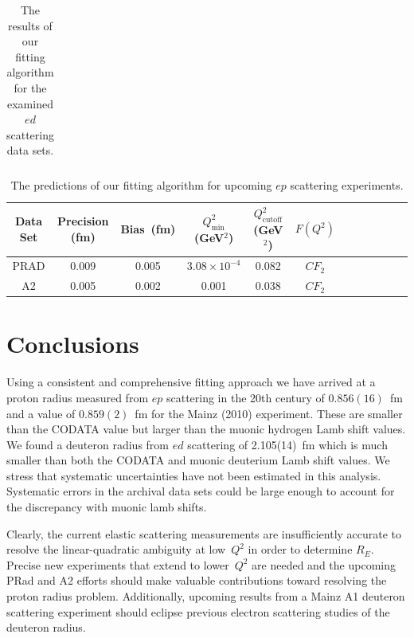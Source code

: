 \documentclass[aps,prd,twocolumn,groupedaddress,10pt]{revtex4-1}
\begin{document}
\begin{widetext}
\begin{center}
\begin{table}
\begin{tabular}{|c |c| c| c| c| c| c| c| c| c| c| c|}
		\hline
	\end{tabular} 
	\caption{The results of our fitting algorithm for the examined $ed$ scattering data sets.}
	\label{deuteron_table}
\end{table}
		\begin{table}[h!]
			\begin{tabular}{|c |c| c| c| c| c| c| c| c| c| c| c|} 
				\hline
				Data Set & Precision (fm) & Bias~(fm) &  $Q^2_\text{min}$ (GeV$^2$) & $Q^2_\text{cutoff}$ (GeV$^2$)  & $F(Q^2)$  \\ 
				\hline
				PRAD & 0.009 & 0.005 & $3.08\times 10^{-4}$ & 0.082 & ${CF}_2$  \\
				\hline
				A2 & 0.005 & 0.002 & 0.001  & 0.038 &  ${CF}_{2}$ \\		
				\hline
			\end{tabular} 
			\caption{The predictions of our fitting algorithm for upcoming $ep$ scattering experiments.}
			\label{future_experiments_table}
\end{table}\end{center}\end{widetext}

\section{Conclusions}

Using a consistent and comprehensive fitting approach we have arrived at a proton radius measured from $ep$ scattering in the 20th century of $0.856(16)$~fm and a value of $0.859(2)$~fm for the Mainz (2010) experiment. These are smaller than the CODATA value but larger than the muonic hydrogen Lamb shift values. We found a deuteron radius from $ed$ scattering of 2.105(14)~fm which is much smaller than both the CODATA and muonic deuterium Lamb shift values. We stress that systematic uncertainties have not been estimated in this analysis. Systematic errors in the archival data sets could be large enough to account for the discrepancy with muonic lamb shifts. 

Clearly, the current elastic scattering measurements are insufficiently accurate to resolve the linear-quadratic ambiguity at low~$Q^2$ in order to determine $R_E$. Precise new experiments that extend to lower~$Q^2$ are needed and the upcoming PRad and A2 efforts should make valuable contributions toward resolving the proton radius problem. Additionally, upcoming results from a Mainz A1 deuteron scattering experiment should eclipse previous electron scattering studies of the deuteron radius.
\end{document}
